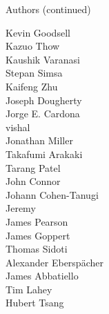 \documentclass[xcolor=svgnames]{beamer}
\begin{document}
\begin{frame}{Authors (continued)}
\begin{multicols}{5}
        Kevin Goodsell\\
        Kazuo Thow\\
        Kaushik Varanasi\\
        Stepan Simsa\\
        Kaifeng Zhu\\
        Joseph Dougherty\\
        Jorge E. Cardona\\
        vishal\\
        Jonathan Miller\\
        Takafumi Arakaki\\
        Tarang Patel\\
        John Connor\\
        Johann Cohen-Tanugi\\
        Jeremy\\
        James Pearson\\
        James Goppert\\
        Thomas Sidoti\\
        Alexander Eberspächer\\
        James Abbatiello\\
        Tim Lahey\\
        Hubert Tsang\\
  \end{multicols}
\end{frame}
\end{document}
